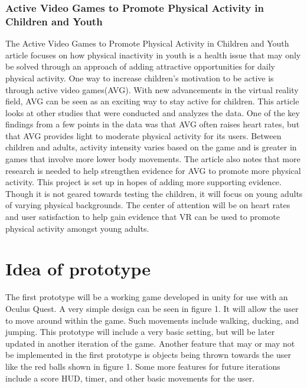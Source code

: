 \documentclass{sigchi}
\begin{document}
\subsubsection{Active Video Games to Promote Physical Activity in Children and Youth}

The Active Video Games to Promote Physical Activity in Children and Youth article\cite{biddiss_2010} focuses on how physical inactivity in youth is a health issue that may only be solved through an approach of adding attractive opportunities for daily physical activity. One way to increase children’s motivation to be active is through active video games(AVG). With new advancements in the virtual reality field, AVG can be seen as an exciting way to stay active for children. This article looks at other studies that were conducted and analyzes the data. One of the key findings from a few points in the data was that AVG often raises heart rates, but that AVG provides light to moderate physical activity for its users. Between children and adults, activity intensity varies based on the game and is greater in games that involve more lower body movements. The article also notes that more research is needed to help strengthen evidence for AVG to promote more physical activity. This project is set up in hopes of adding more supporting evidence. Though it is not geared towards testing the children, it will focus on young adults of varying physical backgrounds. The center of attention will be on heart rates and user satisfaction to help gain evidence that VR can be used to promote physical activity amongst young adults.

\section{Idea of prototype}

The first prototype will be a working game developed in unity for use with an Oculus Quest. A very simple design can be seen in figure 1. It will allow the user to move around within the game. Such movements include walking, ducking, and jumping. This prototype will include a very basic setting, but will be later updated in another iteration of the game. Another feature that may or may not be implemented in the first prototype is objects being thrown towards the user like the red balls shown in figure 1. Some more features for future iterations include a score HUD, timer, and other basic movements for the user.  
\end{document}

